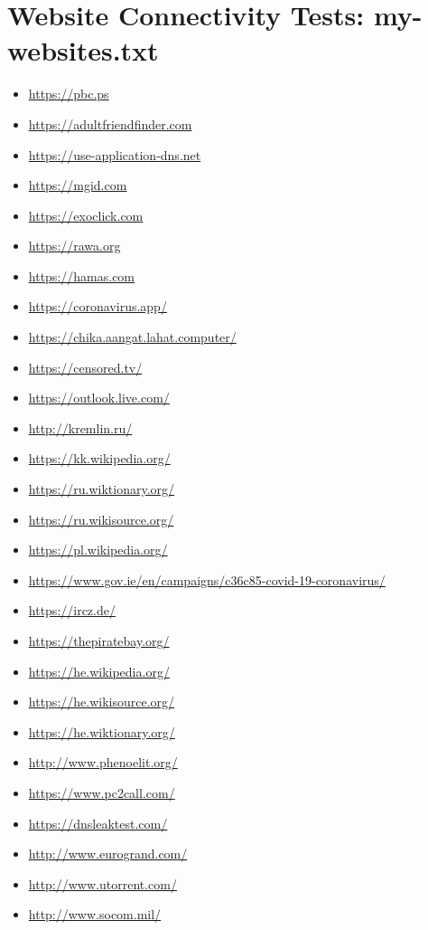 \section{Website Connectivity Tests: my-websites.txt}
\begin{multicols}{2}
\begin{itemize}
    \item \url{https://pbc.ps}
    \item \url{https://adultfriendfinder.com}
    \item \url{https://use-application-dns.net}
    \item \url{https://mgid.com}
    \item \url{https://exoclick.com}
    \item \url{https://rawa.org}
    \item \url{https://hamas.com}
    \item \url{https://coronavirus.app/}
    \item \url{https://chika.aangat.lahat.computer/}
    \item \url{https://censored.tv/}
    \item \url{https://outlook.live.com/}
    \item \url{http://kremlin.ru/}
    \item \url{https://kk.wikipedia.org/}
    \item \url{https://ru.wiktionary.org/}
    \item \url{https://ru.wikisource.org/}
    \item \url{https://pl.wikipedia.org/}
    \item \url{https://www.gov.ie/en/campaigns/c36c85-covid-19-coronavirus/}
    \item \url{https://ircz.de/}
    \item \url{https://thepiratebay.org/}
    \item \url{https://he.wikipedia.org/}
    \item \url{https://he.wikisource.org/}
    \item \url{https://he.wiktionary.org/}
    \item \url{http://www.phenoelit.org/}
    \item \url{https://www.pc2call.com/}
    \item \url{https://dnsleaktest.com/}
    \item \url{http://www.eurogrand.com/}
    \item \url{http://www.utorrent.com/}
    \item \url{http://www.socom.mil/}

\end{itemize}
\end{multicols}
